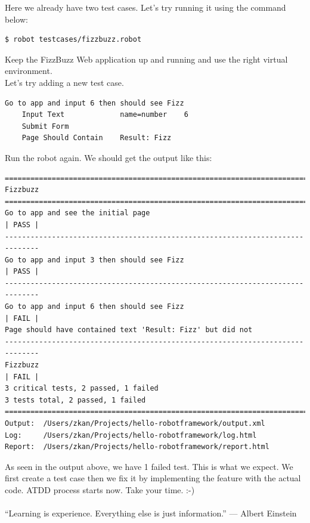 \documentclass{article}
\begin{document}
\noindent Here we already have two test cases. Let's try running it using the
command below:

\begin{verbatim}
$ robot testcases/fizzbuzz.robot
\end{verbatim}

 Keep the FizzBuzz Web application up and running and use
the right virtual environment. \\

\noindent Let's try adding a new test case.

\begin{verbatim}
Go to app and input 6 then should see Fizz
    Input Text             name=number    6
    Submit Form
    Page Should Contain    Result: Fizz
\end{verbatim}

\noindent Run the robot again. We should get the output like this:

\begin{verbatim}
==============================================================================
Fizzbuzz
==============================================================================
Go to app and see the initial page                                    | PASS |
------------------------------------------------------------------------------
Go to app and input 3 then should see Fizz                            | PASS |
------------------------------------------------------------------------------
Go to app and input 6 then should see Fizz                            | FAIL |
Page should have contained text 'Result: Fizz' but did not
------------------------------------------------------------------------------
Fizzbuzz                                                              | FAIL |
3 critical tests, 2 passed, 1 failed
3 tests total, 2 passed, 1 failed
==============================================================================
Output:  /Users/zkan/Projects/hello-robotframework/output.xml
Log:     /Users/zkan/Projects/hello-robotframework/log.html
Report:  /Users/zkan/Projects/hello-robotframework/report.html
\end{verbatim}

\noindent As seen in the output above, we have 1 failed test. This is what we
expect. We first create a test case then we fix it by implementing the feature
with the actual code. ATDD process starts now. Take your time. :-) \\\\

\noindent ``Learning is experience. Everything else is just information.'' ---
Albert Einstein
\end{document}
